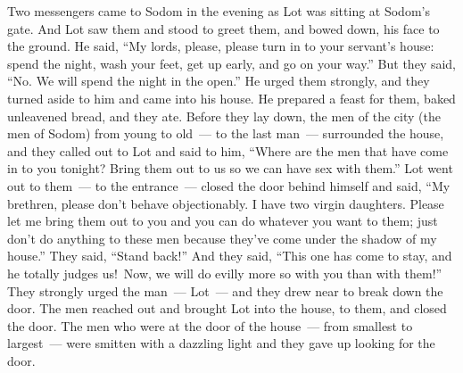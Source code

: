 \begin{inparaenum}
   Two messengers came to Sodom in the evening as Lot was sitting at Sodom's gate. And Lot saw them and stood to greet them, and bowed down, his face to the ground.%
   He said, ``My lords, please, please turn in to your servant's house: spend the night, wash your feet, get up early, and go on your way.'' But they said, ``No. We will spend the night in the open.''%
   He urged them strongly, and they turned aside to him and came into his house. He prepared a feast for them, baked unleavened bread, and they ate.%
   Before they lay down, the men of the city (the men of Sodom) from young to old~--- to the last man~--- surrounded the house,%
   and they called out to Lot and said to him, ``Where are the men that have come in to you tonight? Bring them out to us so we can have sex with them.''%
   Lot went out to them~--- to the entrance~--- closed the door behind himself%
   and said, ``My brethren, please don't behave objectionably.%
   I have two virgin daughters. Please let me bring them out to you and you can do whatever you want to them; just don't do anything to these men because they've come under the shadow of my house.''%
   They said, ``Stand back!'' And they said, ``This one has come to stay, and he totally judges us!\understood\ Now, we will do evilly more so with you than with them!'' They strongly urged the man~--- Lot~--- and they drew near to break down the door.%
   The men reached out and brought Lot into the house, to them, and closed the door.%
   The men who were at the door of the house~--- from smallest to largest~--- were smitten with a dazzling light and they gave up looking for the door.%

\end{inparaenum}
